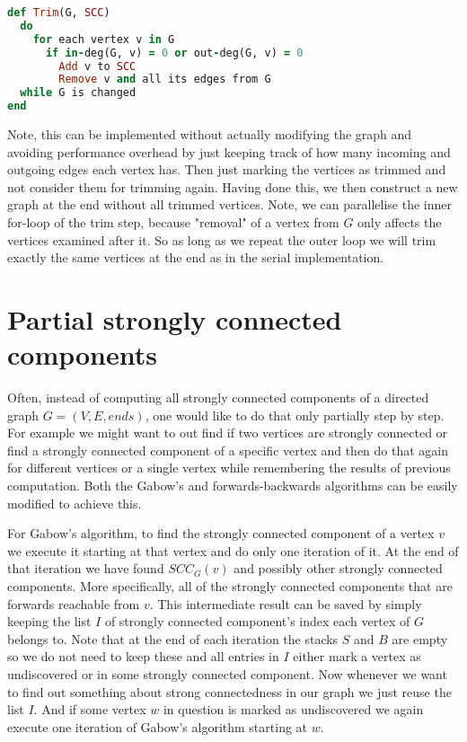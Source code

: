 \documentclass{report}
\theoremstyle{plain}
\theoremstyle{definition}
\theoremstyle{remark}
\numberwithin{definition}{chapter}
\numberwithin{example}{chapter}
\numberwithin{figure}{chapter}
\numberwithin{theorem}{chapter}
\numberwithin{lemma}{chapter}
\begin{document}
\begin{lstlisting}[language=Ruby]
def Trim(G, SCC)
  do
    for each vertex v in G
      if in-deg(G, v) = 0 or out-deg(G, v) = 0
        Add v to SCC
        Remove v and all its edges from G
  while G is changed
end
\end{lstlisting}

Note, this can be implemented without actually modifying the graph and avoiding performance overhead by just keeping track of how many incoming and outgoing edges each vertex has. Then just marking the vertices as trimmed and not consider them for trimming again. Having done this, we then construct a new graph at the end without all trimmed vertices. Note, we can parallelise the inner for-loop of the trim step, because "removal" of a vertex from $G$ only affects the vertices examined after it. So as long as we repeat the outer loop we will trim exactly the same vertices at the end as in the serial implementation.

\section{Partial strongly connected components}

Often, instead of computing all strongly connected components of a directed graph $G=(V, E, ends)$, one would like to do that only partially step by step. For example we might want to  out find if two vertices are strongly connected or find a strongly connected component of a specific vertex and then do that again for different vertices or a single vertex while remembering the results of previous computation. Both the Gabow's and forwards-backwards algorithms can be easily modified to achieve this.

For Gabow's algorithm, to find the strongly connected component of a vertex $v$ we execute it starting at that vertex and do only one iteration of it. At the end of that iteration we have found $SCC_G(v)$ and possibly other strongly connected components. More specifically, all of the strongly connected components that are forwards reachable from $v$. This intermediate result can be saved by simply keeping the list $I$ of strongly connected component's index each vertex of $G$ belongs to. Note that at the end of each iteration the stacks $S$ and $B$ are empty so we do not need to keep these and all entries in $I$ either mark a vertex as undiscovered or in some strongly connected component. Now whenever we want to find out something about strong connectedness in our graph we just reuse the list $I$. And if some vertex $w$ in question is marked as undiscovered we again execute one iteration of Gabow's algorithm starting at $w$.
\end{document}
